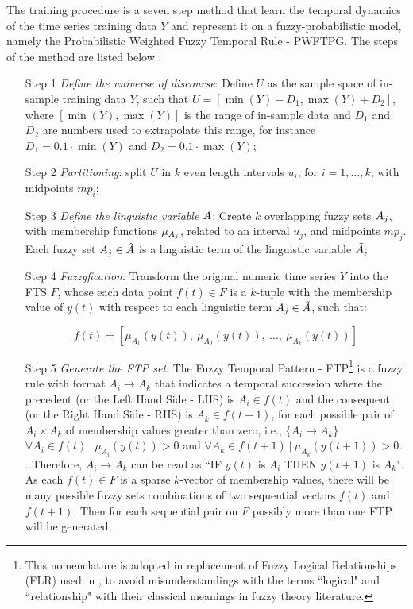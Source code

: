 The training procedure is a seven step method that learn the temporal dynamics of the time series training data $Y$ and represent it on a fuzzy-probabilistic model, namely the Probabilistic Weighted Fuzzy Temporal Rule - PWFTPG. The steps of the method are listed below :

\begin{enumerate}
\item[Step 1] \textit{Define the universe of discourse}: Define $U$ as the sample space of in-sample training data $Y$, such that $U = [\min(Y) - D_1, \max(Y)+D_2]$, where $[\min(Y), \max(Y)]$ is the range of in-sample data and $D_1$ and $D_2$ are numbers used to extrapolate this range, for instance $D_1 = 0.1\cdot\min(Y)$ and $D_2 = 0.1\cdot\max(Y)$;

\item[Step 2] \textit{Partitioning}: split $U$ in $k$ even length intervals $u_i$, for $i = 1,\ldots,k$, with midpoints $mp_i$;

\item[Step 3] \textit{Define the linguistic variable $\tilde{A}$}: Create $k$ overlapping fuzzy sets $A_j$, with membership functions $\mu_{A_j}$, related to an interval $u_j$, and midpoints $mp_j$. Each fuzzy set $A_j \in \tilde{A}$ is a linguistic term of the linguistic variable $\tilde{A}$;

\item[Step 4] \textit{Fuzzyfication}: Transform the original numeric time series $Y$ into the FTS $F$, whose each data point $f(t) \in F$ is a $k$-tuple with the membership value of $y(t)$ with respect to each linguistic term $A_j \in \tilde{A}$, such that:

\begin{equation}
f(t) = \left[\mu_{A_1}(y(t)),\ \mu_{A_2}(y(t)),\ \ldots,\ \mu_{A_k}(y(t)) \right]
\end{equation}

\item[Step 5] \textit{Generate the FTP set}: The Fuzzy Temporal Pattern - FTP\footnote{This nomenclature is adopted in replacement of Fuzzy Logical Relationships (FLR) used in \cite{song1993fuzzy}, to avoid misunderstandings with the terms ``logical" and ``relationship" with their classical meanings in fuzzy theory literature.} is a fuzzy rule with format $A_i \rightarrow A_k$ that indicates a temporal succession where the precedent (or the Left Hand Side - LHS) is $A_i \in f(t)$ and the consequent (or the Right Hand Side - RHS) is $A_k \in f(t+1)$, for each possible pair of $A_i \times A_k$ of membership values greater than zero, i.e.,  $\{A_i \rightarrow A_k\}$ $\forall A_i \in f(t)\ |\ \mu_{A_i}(y(t)) > 0$ and $\forall A_k \in f(t+1)\ |\ \mu_{A_k}(y(t+1)) > 0 $. . Therefore, $A_i \rightarrow A_k$ can be read as ``IF $y(t)$ is $A_i$ THEN $y(t+1)$ is $A_k$".
As each $f(t) \in F$ is a sparse $k$-vector of membership values, there will be many possible fuzzy sets combinations of two sequential vectors $f(t)$ and $f(t+1)$. Then for each sequential pair on $F$ possibly more than one FTP will be generated;


\end{enumerate}
